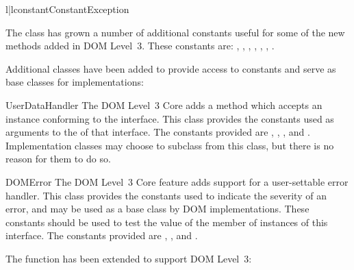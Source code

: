 \documentclass{howto}
\begin{document}
\begin{tableii}{l|l}{constant}{Constant}{Exception}
\end{tableii}

The  class has grown a number of additional constants
useful for some of the new methods added in DOM Level~3.  These
constants are:  ,
, ,
,
,
,
.

Additional classes have been added to provide access to constants and
serve as base classes for implementations:

\begin{classdesc*}{UserDataHandler}
  The DOM Level~3 Core adds a method
   which accepts an instance conforming to the
   interface.  This class provides the
  constants used as arguments to the  of that
  interface.  The constants provided are ,
  , , and
  .  Implementation classes may choose to
  subclass from this class, but there is no reason for them to do so.
\end{classdesc*}

\begin{classdesc*}{DOMError}
  The DOM Level~3 Core feature adds support for a user-settable
  error handler.  This class provides the constants used to indicate
  the severity of an error, and may be used as a base class by DOM
  implementations.  These constants should be used to test the value
  of the  member of instances of this interface.  The
  constants provided are ,
  , and .
\end{classdesc*}

The  function has been extended to
support DOM Level~3:
\end{document}
